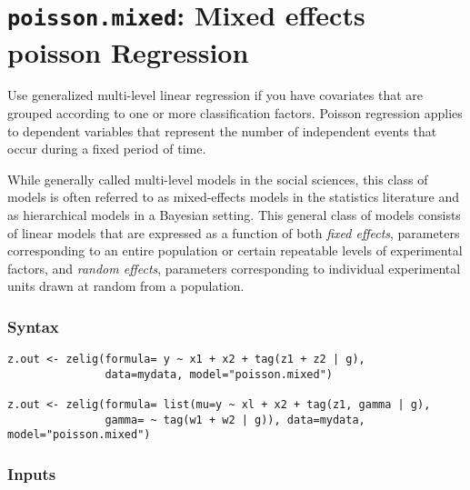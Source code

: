 \section{{\tt poisson.mixed}: Mixed effects poisson Regression}
\label{mixed}

Use generalized multi-level linear regression if you have covariates that are grouped according to one or more classification factors. Poisson regression applies to dependent variables that represent the number of independent events that occur during a fixed period of time.

While generally called multi-level models in the social sciences, this class of models is often referred to as mixed-effects models in the statistics literature and as hierarchical models in a Bayesian setting. This general class of models consists of linear models that are expressed as a function of both \emph{fixed effects}, parameters corresponding to an entire population or certain repeatable levels of experimental factors, and \emph{random effects}, parameters corresponding to individual experimental units drawn at random from a population.

\subsubsection{Syntax}

\begin{verbatim}
z.out <- zelig(formula= y ~ x1 + x2 + tag(z1 + z2 | g),
               data=mydata, model="poisson.mixed")

z.out <- zelig(formula= list(mu=y ~ xl + x2 + tag(z1, gamma | g),
               gamma= ~ tag(w1 + w2 | g)), data=mydata, model="poisson.mixed")
\end{verbatim}

\subsubsection{Inputs}

